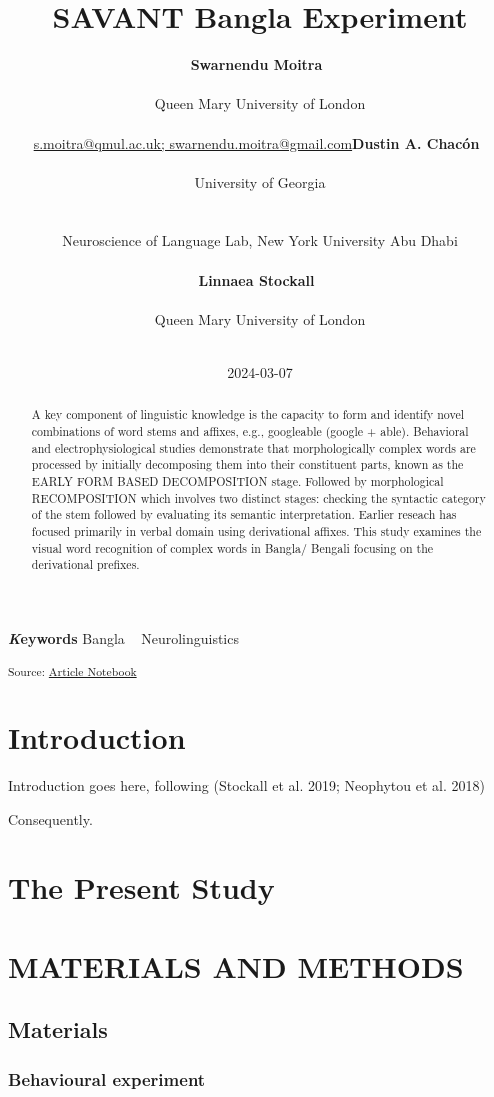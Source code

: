 \documentclass[
]{article}
\title{SAVANT Bangla Experiment}
\author{\textbf{Swarnendu
Moitra}~\orcidlink{0000-0001-6830-3284}\\\\Queen Mary University of
London\\\\\href{mailto:s.moitra@qmul.ac.uk;
swarnendu.moitra@gmail.com}{s.moitra@qmul.ac.uk;
swarnendu.moitra@gmail.com}\asep\textbf{Dustin A.
Chacón}~\orcidlink{0009-0002-8438-1914}\\\\University of
Georgia\\\\\\Neuroscience of Language Lab, New York University Abu
Dhabi\\\\\asep\textbf{Linnaea
Stockall}~\orcidlink{0000-0002-4700-5154}\\\\Queen Mary University of
London\\\\}
\date{2024-03-07}
\begin{document}
\maketitle
\begin{abstract}
A key component of linguistic knowledge is the capacity to form and
identify novel combinations of word stems and affixes, e.g., googleable
(google + able). Behavioral and electrophysiological studies demonstrate
that morphologically complex words are processed by initially
decomposing them into their constituent parts, known as the EARLY FORM
BASED DECOMPOSITION stage. Followed by morphological RECOMPOSITION which
involves two distinct stages: checking the syntactic category of the
stem followed by evaluating its semantic interpretation. Earlier reseach
has focused primarily in verbal domain using derivational affixes. This
study examines the visual word recognition of complex words in Bangla/
Bengali focusing on the derivational prefixes.
\end{abstract}
{\bfseries \emph Keywords}
\def\sep{\textbullet\ }
Bangla \sep 
Neurolinguistics


\textsubscript{Source:
\href{https://SwarMoi.github.io/Moitra-et-al_SAVANT/index-preview.html}{Article
Notebook}}

\section{Introduction}\label{introduction}

Introduction goes here, following (Stockall et al. 2019; Neophytou et
al. 2018)

Consequently.

\section{The Present Study}\label{the-present-study}

\section{MATERIALS AND METHODS}\label{sec-data-methods}

\subsection{Materials}\label{materials}

\subsubsection{Behavioural experiment}\label{behavioural-experiment}
\end{document}
